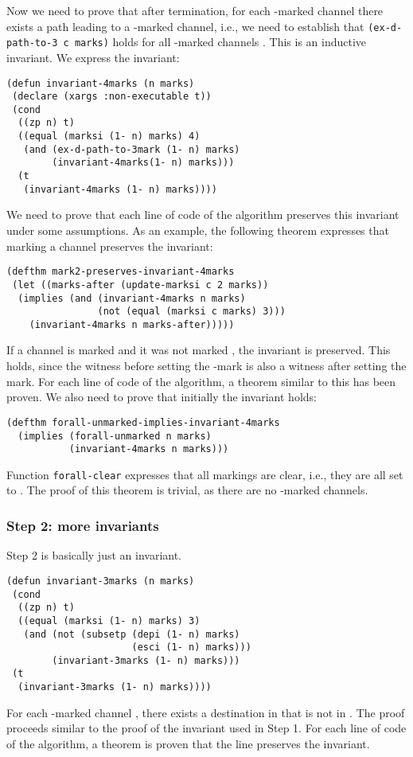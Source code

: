 \documentclass[submission,copyright]{eptcs}
\begin{document}
Now we need to prove that after termination, for each -marked channel there exists a path leading to a -marked channel, i.e., we need to establish that {\tt (ex-d-path-to-3 c marks)} holds for all -marked channels . This is an inductive invariant.
We express the invariant:
\begin{verbatim}
(defun invariant-4marks (n marks)
 (declare (xargs :non-executable t)) 
 (cond
  ((zp n) t)
  ((equal (marksi (1- n) marks) 4)
   (and (ex-d-path-to-3mark (1- n) marks)
        (invariant-4marks(1- n) marks)))
  (t
   (invariant-4marks (1- n) marks))))
\end{verbatim}
We need to prove that each line of code of the algorithm preserves this invariant under some assumptions. As an example, the following theorem expresses that marking a channel  preserves the invariant:
\begin{verbatim}
(defthm mark2-preserves-invariant-4marks
 (let ((marks-after (update-marksi c 2 marks))
  (implies (and (invariant-4marks n marks)
                (not (equal (marksi c marks) 3)))
    (invariant-4marks n marks-after)))))
\end{verbatim}
If a channel  is marked  and it was not marked , the invariant is preserved. This holds, since the witness  before setting the -mark is also a witness after setting the mark. 
For each line of code of the algorithm, a theorem similar to this has been proven. We also need to prove that initially the invariant holds:
\begin{verbatim}
(defthm forall-unmarked-implies-invariant-4marks
  (implies (forall-unmarked n marks)
           (invariant-4marks n marks)))
\end{verbatim}
Function {\tt forall-clear} expresses that all markings are clear, i.e., they are all set to . The proof of this theorem is trivial, as there are no -marked channels.

\subsubsection{Step 2: more invariants}
Step 2 is basically just an invariant. 
\begin{verbatim}
(defun invariant-3marks (n marks)
 (cond
  ((zp n) t)
  ((equal (marksi (1- n) marks) 3)
   (and (not (subsetp (depi (1- n) marks)
                      (esci (1- n) marks)))
        (invariant-3marks (1- n) marks)))
 (t
  (invariant-3marks (1- n) marks))))
\end{verbatim}
For each -marked channel , there exists a destination in  that is not in .
The proof proceeds similar to the proof of the invariant used in Step 1. For each line of code of the algorithm, a theorem is proven that the line preserves the invariant.
\end{document}
